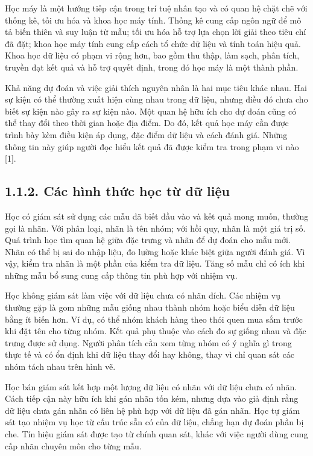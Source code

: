 Học máy là một hướng tiếp cận trong trí tuệ nhân tạo và có quan hệ chặt chẽ với thống kê, tối ưu hóa và khoa học máy tính. Thống kê cung cấp ngôn ngữ để mô tả biến thiên và suy luận từ mẫu; tối ưu hóa hỗ trợ lựa chọn lời giải theo tiêu chí đã đặt; khoa học máy tính cung cấp cách tổ chức dữ liệu và tính toán hiệu quả. Khoa học dữ liệu có phạm vi rộng hơn, bao gồm thu thập, làm sạch, phân tích, truyền đạt kết quả và hỗ trợ quyết định, trong đó học máy là một thành phần.


Khả năng dự đoán và việc giải thích nguyên nhân là hai mục tiêu khác nhau. Hai sự kiện có thể thường xuất hiện cùng nhau trong dữ liệu, nhưng điều đó chưa cho biết sự kiện nào gây ra sự kiện nào. Một quan hệ hữu ích cho dự đoán cũng có thể thay đổi theo thời gian hoặc địa điểm. Do đó, kết quả học máy cần được trình bày kèm điều kiện áp dụng, đặc điểm dữ liệu và cách đánh giá. Những thông tin này giúp người đọc hiểu kết quả đã được kiểm tra trong phạm vi nào [1].


\subsection{1.1.2. Các hình thức học từ dữ liệu}

Học có giám sát sử dụng các mẫu đã biết đầu vào và kết quả mong muốn, thường gọi là nhãn. Với phân loại, nhãn là tên nhóm; với hồi quy, nhãn là một giá trị số. Quá trình học tìm quan hệ giữa đặc trưng và nhãn để dự đoán cho mẫu mới. Nhãn có thể bị sai do nhập liệu, đo lường hoặc khác biệt giữa người đánh giá. Vì vậy, kiểm tra nhãn là một phần của kiểm tra dữ liệu. Tăng số mẫu chỉ có ích khi những mẫu bổ sung cung cấp thông tin phù hợp với nhiệm vụ.


Học không giám sát làm việc với dữ liệu chưa có nhãn đích. Các nhiệm vụ thường gặp là gom những mẫu giống nhau thành nhóm hoặc biểu diễn dữ liệu bằng ít biến hơn. Ví dụ, có thể nhóm khách hàng theo thói quen mua sắm trước khi đặt tên cho từng nhóm. Kết quả phụ thuộc vào cách đo sự giống nhau và đặc trưng được sử dụng. Người phân tích cần xem từng nhóm có ý nghĩa gì trong thực tế và có ổn định khi dữ liệu thay đổi hay không, thay vì chỉ quan sát các nhóm tách nhau trên hình vẽ.


Học bán giám sát kết hợp một lượng dữ liệu có nhãn với dữ liệu chưa có nhãn. Cách tiếp cận này hữu ích khi gán nhãn tốn kém, nhưng dựa vào giả định rằng dữ liệu chưa gán nhãn có liên hệ phù hợp với dữ liệu đã gán nhãn. Học tự giám sát tạo nhiệm vụ học từ cấu trúc sẵn có của dữ liệu, chẳng hạn dự đoán phần bị che. Tín hiệu giám sát được tạo từ chính quan sát, khác với việc người dùng cung cấp nhãn chuyên môn cho từng mẫu.


